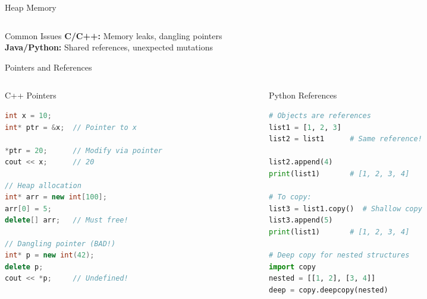 \documentclass[aspectratio=169,xcolor=dvipsnames]{beamer}
\begin{document}
\begin{frame}{Heap Memory}
\begin{columns}
\begin{column}{0.45\textwidth}
    \end{column}
  \end{columns}

  \vspace{0.3cm}

  \begin{alertblock}{Common Issues}
    \textbf{C/C++:} Memory leaks, dangling pointers \\
    \textbf{Java/Python:} Shared references, unexpected mutations
  \end{alertblock}
\end{frame}

\begin{frame}[fragile]{Pointers and References}
  \begin{columns}
    \begin{column}{0.48\textwidth}
      \begin{exampleblock}{C++ Pointers}
        \begin{lstlisting}[language=C++,basicstyle=\tiny\ttfamily]
int x = 10;
int* ptr = &x;  // Pointer to x

*ptr = 20;      // Modify via pointer
cout << x;      // 20

// Heap allocation
int* arr = new int[100];
arr[0] = 5;
delete[] arr;   // Must free!

// Dangling pointer (BAD!)
int* p = new int(42);
delete p;
cout << *p;     // Undefined!
        \end{lstlisting}
      \end{exampleblock}
    \end{column}
    \begin{column}{0.48\textwidth}
      \begin{exampleblock}{Python References}
        \begin{lstlisting}[language=Python,basicstyle=\tiny\ttfamily]
# Objects are references
list1 = [1, 2, 3]
list2 = list1      # Same reference!

list2.append(4)
print(list1)       # [1, 2, 3, 4]

# To copy:
list3 = list1.copy()  # Shallow copy
list3.append(5)
print(list1)       # [1, 2, 3, 4]

# Deep copy for nested structures
import copy
nested = [[1, 2], [3, 4]]
deep = copy.deepcopy(nested)
        \end{lstlisting}
      \end{exampleblock}
    \end{column}
  \end{columns}


\end{frame}
\end{document}
